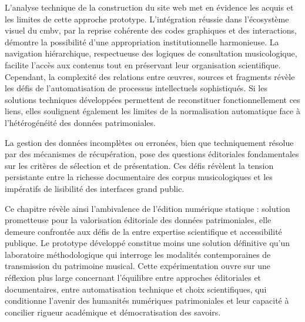 L'analyse technique de la construction du site web met en évidence les acquis et les limites de cette approche prototype. L'intégration réussie dans l'écosystème visuel du \gls{cmbv}, par la reprise cohérente des codes graphiques et des interactions, démontre la possibilité d'une appropriation institutionnelle harmonieuse. La navigation hiérarchique, respectueuse des logiques de consultation musicologique, facilite l'accès aux contenus tout en préservant leur organisation scientifique. Cependant, la complexité des relations entre œuvres, sources et fragments révèle les défis de l'automatisation de processus intellectuels sophistiqués. Si les solutions techniques développées permettent de reconstituer fonctionnellement ces liens, elles soulignent également les limites de la normalisation automatique face à l'hétérogénéité des données patrimoniales.

La gestion des données incomplètes ou erronées, bien que techniquement résolue par des mécanismes de récupération, pose des questions éditoriales fondamentales sur les critères de sélection et de présentation. Ces défis révèlent la tension persistante entre la richesse documentaire des corpus musicologiques et les impératifs de lisibilité des interfaces grand public.

Ce chapitre révèle ainsi l'ambivalence de l'édition numérique statique : solution prometteuse pour la valorisation éditoriale des données patrimoniales, elle demeure confrontée aux défis de la  entre expertise scientifique et accessibilité publique. Le prototype développé constitue moins une solution définitive qu'un laboratoire méthodologique qui interroge les modalités contemporaines de transmission du patrimoine musical. Cette expérimentation ouvre sur une réflexion plus large concernant l'équilibre entre approches éditoriales et documentaires, entre automatisation technique et choix scientifiques, qui conditionne l'avenir des humanités numériques patrimoniales et leur capacité à concilier rigueur académique et démocratisation des savoirs.